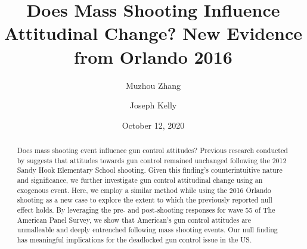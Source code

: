 \documentclass[11pt]{article}
\title{Does Mass Shooting Influence Attitudinal Change? New Evidence from Orlando 2016}
\author[1, *]{Muzhou Zhang}
\author[1]{Joseph Kelly}
\affil[1]{\small Department of Government, University of Essex, UK}
\affil[*]{\small Corresponding author. Email: \url{muzhou.zhang@essex.ac.uk}}
\date{October 12, 2020}
\begin{document}
\maketitle
\thispagestyle{empty}
\begin{abstract}
Does mass shooting event influence gun control attitudes? Previous research conducted by \textcite{rogowski2019critical-events} suggests that attitudes towards gun control remained unchanged following the 2012 Sandy Hook Elementary School shooting. Given this finding's counterintuitive nature and significance, we further investigate gun control attitudinal change using an exogenous event. Here, we employ a similar method while using the 2016 Orlando shooting as a new case to explore the extent to which the previously reported null effect holds. By leveraging the pre- and post-shooting responses for wave 55 of The American Panel Survey, we show that American's gun control attitudes are unmalleable and deeply entrenched following mass shooting events. Our null finding has meaningful implications for the deadlocked gun control issue in the US.
\end{abstract}
\clearpage
\end{document}
